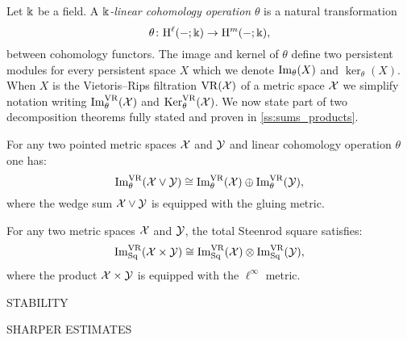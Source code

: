 Let \(\Bbbk\) be a field.
A \textit{\(\Bbbk\)-linear cohomology operation} \(\theta\) is a natural transformation
\[
\theta \colon \mathrm{H}^\ell(-;\Bbbk) \to \mathrm{H}^m(-;\Bbbk),
\]
between cohomology functors.
The image and kernel of \(\theta\) define two persistent modules for every persistent space \(X\) which we denote \(\operatorname{Im}_\theta(X)\) and \(\ker_\theta(X)\).
When \(X\) is the Vietoris--Rips filtration \(\mathrm{VR}(\mathcal{X})\) of a metric space \(\mathcal{X}\) we simplify notation writing \(\operatorname{Im}_\theta^{\mathrm{VR}}(\mathcal{X})\) and \(\operatorname{Ker}_\theta^{\mathrm{VR}}(\mathcal{X})\).
We now state part of two decomposition theorems fully stated and proven in \cref{ss:sums_products}.

\medskip\theorem For any two pointed metric spaces $\mathcal{X}$ and $\mathcal{Y}$ and linear cohomology operation \(\theta\) one has:
\[
\operatorname{Im}_\theta^{\mathrm{VR}}(\mathcal{X} \vee \mathcal{Y}) \cong \operatorname{Im}_\theta^{\mathrm{VR}}(\mathcal{X}) \oplus \operatorname{Im}_\theta^{\mathrm{VR}}(\mathcal{Y}),
\]
where the wedge sum \(\mathcal{X} \vee \mathcal{Y}\) is equipped with the gluing metric.

\medskip\theorem
For any two metric spaces $\mathcal{X}$ and $\mathcal{Y}$, the total Steenrod square satisfies:
\[
\operatorname{Im}^{\mathrm{VR}}_{\mathrm{Sq}}(\mathcal{X} \times \mathcal{Y}) \cong \operatorname{Im}^{\mathrm{VR}}_{\mathrm{Sq}}(\mathcal{X}) \otimes \operatorname{Im}^{\mathrm{VR}}_{\mathrm{Sq}}(\mathcal{Y}),
\]
where the product \(\mathcal{X} \times \mathcal{Y}\) is equipped with the \(\ell^\infty\) metric.

STABILITY

SHARPER ESTIMATES


%
%

